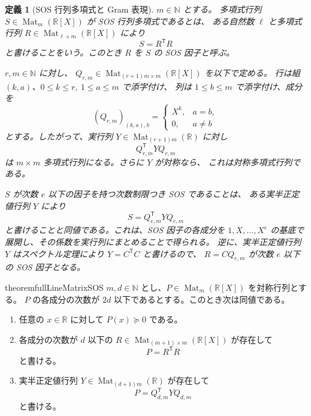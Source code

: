 \documentclass[uplatex,dvipdfmx]{jsarticle}
\newcommand{\Poly}{\mathbb{R}[X]}
\newcommand{\Mat}{\operatorname{Mat}}
\newcommand{\psd}{\succeq 0}
\theoremstyle{matrixsosdefinition}
\newtheorem{definition}[theorem]{定義}
\begin{document}
\begin{definition}[SOS 行列多項式と Gram 表現]\label{def:sos-gram}
  \(m\in\mathbb{N}\) とする。
  多項式行列 \(S\in\Mat_m(\Poly)\) が SOS 行列多項式であるとは、
  ある自然数 \(\ell\) と多項式行列
  \(R\in\Mat_{\ell\times m}(\Poly)\) により
	  \[
	    S=R^{\mathsf T}R
	  \]
	  と書けることをいう。このとき \(R\) を \(S\) の SOS 因子と呼ぶ。

	  \(r,m\in\mathbb{N}\) に対し、
	  \(Q_{r,m}\in\Mat_{(r+1)m\times m}(\Poly)\) を以下で定める。
	  行は組 \((k,a)\)、\(0\le k\le r,\ 1\le a\le m\) で添字付け、
	  列は \(1\le b\le m\) で添字付け、成分を
  \[
    (Q_{r,m})_{(k,a),b}=
    \begin{cases}
      X^k, & a=b,\\
      0, & a\ne b
    \end{cases}
  \]
	  とする。したがって、実行列 \(Y\in\Mat_{(r+1)m}(\mathbb{R})\) に対し
	  \[
	    Q_{r,m}^{\mathsf T}YQ_{r,m}
	  \]
	  は \(m\times m\) 多項式行列になる。さらに \(Y\) が対称なら、
	  これは対称多項式行列である。

  \(S\) が次数 \(e\) 以下の因子を持つ次数制限つき SOS であることは、
	  ある実半正定値行列 \(Y\) により
  \[
    S=Q_{e,m}^{\mathsf T}YQ_{e,m}
  \]
  と書けることと同値である。これは、SOS 因子の各成分を
  \(1,X,\ldots,X^e\) の基底で展開し、その係数を実行列にまとめることで得られる。
  逆に、実半正定値行列 \(Y\) はスペクトル定理により \(Y=C^{\mathsf T}C\) と書けるので、
  \(R=CQ_{e,m}\) が次数 \(e\) 以下の SOS 因子となる。
\end{definition}

\begin{restatable}{theorem}{fullLineMatrixSOS}\label{thm:full-line-matrix-sos}
  \(m,d\in\mathbb{N}\) とし、\(P\in\Mat_m(\Poly)\) を対称行列とする。
  \(P\) の各成分の次数が \(2d\) 以下であるとする。このとき次は同値である。
  \begin{enumerate}[label=(\arabic*)]
    \item 任意の \(x\in\mathbb{R}\) に対して \(P(x)\psd\) である。
    \item 各成分の次数が \(d\) 以下の
      \(R\in\Mat_{(m+1)\times m}(\Poly)\) が存在して
      \[
        P=R^{\mathsf T}R
      \]
      と書ける。
    \item 実半正定値行列
      \(Y\in\Mat_{(d+1)m}(\mathbb{R})\) が存在して
      \[
        P=Q_{d,m}^{\mathsf T}YQ_{d,m}
      \]
      と書ける。
  \end{enumerate}
\end{restatable}
\end{document}
